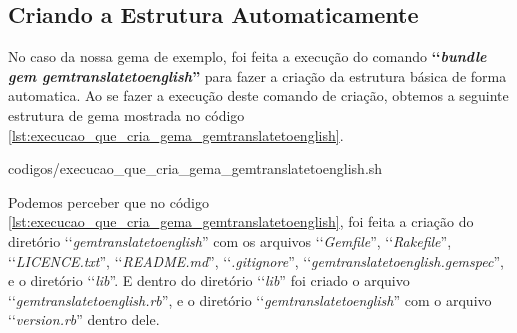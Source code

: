 \subsection{Criando a Estrutura Automaticamente}
\label{subsection:criando_a_estrutura_automaticamente}


No caso da nossa gema de exemplo, foi feita a execução do comando \textbf{‘‘\emph{bundle gem gemtranslatetoenglish}''}
para fazer a criação da estrutura básica de forma automatica. Ao se fazer a execução deste comando de criação, obtemos
a seguinte estrutura de gema mostrada no código \ref{lst:execucao_que_cria_gema_gemtranslatetoenglish}.

%



{codigos/execucao_que_cria_gema_gemtranslatetoenglish.sh}

Podemos perceber que no código \ref{lst:execucao_que_cria_gema_gemtranslatetoenglish}, foi feita a criação do
diretório ‘‘\emph{gemtranslatetoenglish}'' com os arquivos ‘‘\emph{Gemfile}'', ‘‘\emph{Rakefile}'',
‘‘\emph{LICENCE.txt}'', ‘‘\emph{README.md}'', ‘‘\emph{.gitignore}'', ‘‘\emph{gemtranslatetoenglish.gemspec}'',
e o diretório ‘‘\emph{lib}''. E dentro do diretório ‘‘\emph{lib}'' foi criado o arquivo
‘‘\emph{gemtranslatetoenglish.rb}'', e o diretório ‘‘\emph{gemtranslatetoenglish}'' com o arquivo
‘‘\emph{version.rb}'' dentro dele.


